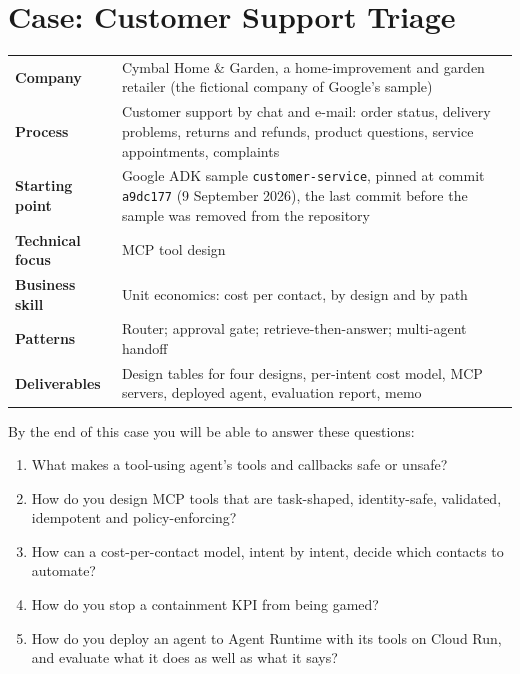 
\chapter{Case: Customer Support Triage}
\label{ch:case-support}

\begin{caseglance}
\begin{tabularx}{\linewidth}{@{}>{\bfseries}p{3.4cm}X@{}}
Company & Cymbal Home \& Garden, a home-improvement and garden retailer (the fictional company of Google's sample) \\
Process & Customer support by chat and e-mail: order status, delivery problems, returns and refunds, product questions, service appointments, complaints \\
Starting point & Google ADK sample \texttt{customer-service}, pinned at commit \texttt{a9dc177} (9 September 2026), the last commit before the sample was removed from the repository \\
Technical focus & MCP tool design \\
Business skill & Unit economics: cost per contact, by design and by path \\
Patterns & Router; approval gate; retrieve-then-answer; multi-agent handoff \\
Deliverables & Design tables for four designs, per-intent cost model, MCP servers, deployed agent, evaluation report, memo
\end{tabularx}
\end{caseglance}

\begin{chapterquestions}
By the end of this case you will be able to answer these questions:
\begin{enumerate}[leftmargin=*,itemsep=2pt]
  \item What makes a tool-using agent's tools and callbacks safe or unsafe?
  \item How do you design MCP tools that are task-shaped, identity-safe, validated, idempotent and policy-enforcing?
  \item How can a cost-per-contact model, intent by intent, decide which contacts to automate?
  \item How do you stop a containment KPI from being gamed?
  \item How do you deploy an agent to Agent Runtime with its tools on Cloud Run, and evaluate what it does as well as what it says?
\end{enumerate}
\end{chapterquestions}

